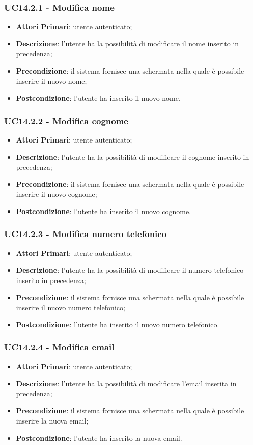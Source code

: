 \subsubsection{UC14.2.1 - Modifica nome}
\begin{itemize}
	\item \textbf{Attori Primari}: utente autenticato;
	\item \textbf{Descrizione}: l'utente ha la possibilità di modificare il nome inserito in precedenza;
	\item \textbf{Precondizione}: il sistema fornisce una schermata nella quale è possibile inserire il nuovo nome;
	\item \textbf{Postcondizione}: l'utente ha inserito il nuovo nome.
\end{itemize}
\subsubsection{UC14.2.2 - Modifica cognome}
\begin{itemize}
	\item \textbf{Attori Primari}: utente autenticato;
	\item \textbf{Descrizione}: l'utente ha la possibilità di modificare il cognome inserito in precedenza;
	\item \textbf{Precondizione}: il sistema fornisce una schermata nella quale è possibile inserire il nuovo cognome;
	\item \textbf{Postcondizione}: l'utente ha inserito il nuovo cognome.
\end{itemize}
\subsubsection{UC14.2.3 - Modifica numero telefonico}
\begin{itemize}
	\item \textbf{Attori Primari}: utente autenticato;
	\item \textbf{Descrizione}: l'utente ha la possibilità di modificare il numero telefonico inserito in precedenza;
	\item \textbf{Precondizione}: il sistema fornisce una schermata nella quale è possibile inserire il nuovo numero telefonico;
	\item \textbf{Postcondizione}: l'utente ha inserito il nuovo numero telefonico.
\end{itemize}
\subsubsection{UC14.2.4 - Modifica email}
\begin{itemize}
	\item \textbf{Attori Primari}: utente autenticato;
	\item \textbf{Descrizione}: l'utente ha la possibilità di modificare l'email inserita in precedenza;
	\item \textbf{Precondizione}: il sistema fornisce una schermata nella quale è possibile inserire la nuova email;
	\item \textbf{Postcondizione}: l'utente ha inserito la nuova email.
\end{itemize}
